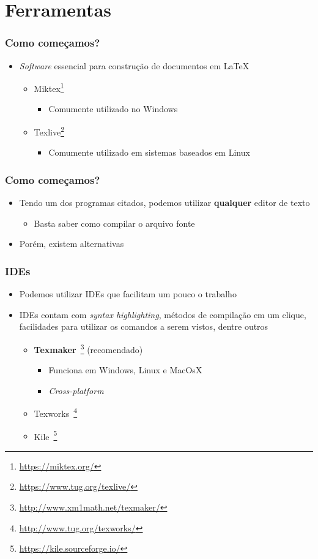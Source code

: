 \section{Ferramentas}

\begin{frame}[fragile] \frametitle{Como começamos?}
\begin{itemize}
	\item \textit{Software} essencial para construção de documentos em LaTeX
	\begin{itemize}
		\item Miktex\footnote{\url{https://miktex.org/}}
		\begin{itemize}
			\item Comumente utilizado no Windows
		\end{itemize}
		\item Texlive\footnote{\url{https://www.tug.org/texlive/}}
		\begin{itemize}
			\item Comumente utilizado em sistemas baseados em Linux
		\end{itemize}
	\end{itemize}
\end{itemize}
\end{frame}

\begin{frame}[fragile] \frametitle{Como começamos?}
\begin{itemize}
	\item Tendo um dos programas citados, podemos utilizar \textbf{qualquer} editor de texto
	\begin{itemize}
		\item Basta saber como compilar o arquivo fonte
	\end{itemize}
	\item Porém, existem alternativas
\end{itemize}
\end{frame}

\begin{frame}[fragile] \frametitle{IDEs}
\begin{itemize}
	\item Podemos utilizar IDEs que facilitam um pouco o trabalho
	\item IDEs contam com \textit{syntax highlighting}, métodos de compilação em um clique, facilidades para utilizar os comandos a serem vistos, dentre outros
	\begin{itemize}
		\item \textbf{Texmaker}~\footnote{\url{http://www.xm1math.net/texmaker/}} (recomendado)
		\begin{itemize}
			\item Funciona em Windows, Linux e MacOsX
			\item \textit{Cross-platform}
		\end{itemize}
		\item Texworks~\footnote{\url{http://www.tug.org/texworks/}}
		\item Kile~\footnote{\url{https://kile.sourceforge.io/}}
	\end{itemize}
\end{itemize}
\end{frame}

